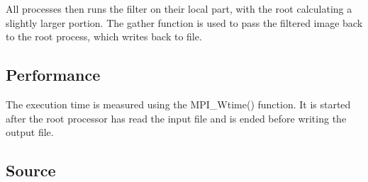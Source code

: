 \documentclass[a4paper, 12pt]{article}
\begin{document}
All processes then runs the filter on their local part, with the root
calculating a slightly larger portion. The gather function is used to pass the
filtered image back to the root process, which writes back to file.

\subsection{Performance}

The execution time is measured using the MPI\_Wtime() function. It is started
after the root processor has read the input file
and is ended before writing the output file.

\subsection{Source}
\end{document}
